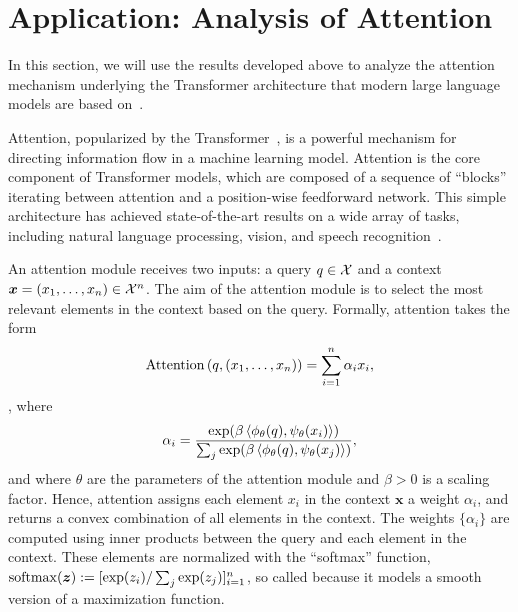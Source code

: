 \section{Application: Analysis of Attention}\label{sec:app_attention}

In this section, we will use the results developed above to analyze the attention mechanism underlying the Transformer architecture that modern large language models are based on~\parencite[e.g.,][]{chungScalingInstructionFinetunedLanguage2022,openaiGPT4TechnicalReport2023,touvronLlamaOpenFoundation2023,taoriAlpacaStrongReplicable2023}.

Attention, popularized by the Transformer~\parencite{vaswani2017attention}, is a powerful mechanism for directing information flow in a machine learning model. Attention is the core component of Transformer models, which are composed of a sequence of ``blocks'' iterating between attention and a position-wise feedforward network. This simple architecture has achieved state-of-the-art results on a wide array of tasks, including natural language processing, vision, and speech recognition~\parencite[e.g.,][]{devlinBertPretrainingDeep2018,dongSpeechtransformerNorecurrenceSequencetosequence2018,dosovitskiyImageWorth16x162020,raffelExploringLimitsTransfer2020,liuSwinTransformerHierarchical2021}.

An attention module receives two inputs: a query $q \in {\mathcal{X}}$ and a context $\bm{x} = (x_1, \ldots, x_n) \in {\mathcal{X}}^n$. The aim of the attention module is to select the most relevant elements in the context based on the query. Formally, attention takes the form
\begin{equation}\label{eq:def_attention}
\mathrm{Attention}\paren{q, (x_1, \ldots, x_n)} = \sum_{i=1}^n \alpha_i x_i,
\end{equation}, 
where 
\begin{equation}
\alpha_i = \frac{\exp(\beta \left \langle \phi_\theta(q), \psi_\theta(x_i) \right\rangle)}{\sum_j \exp(\beta \left \langle \phi_\theta(q), \psi_\theta(x_j) \right\rangle)},
\end{equation}
and where $\theta$ are the parameters of the attention module and $\beta > 0$ is a scaling factor. Hence, attention assigns each element $x_i$ in the context $\bm{x}$ a weight $\alpha_i$, and returns a convex combination of all elements in the context. The weights $\{\alpha_i\}$ are computed using inner products between the query and each element in the context. These elements are normalized with the ``softmax'' function, $\mathrm{softmax}(\bm{z}) := [\exp(z_i) / \sum_j \exp(z_j)]_{i=1}^{n}$, so called because it models a smooth version of a maximization function.

